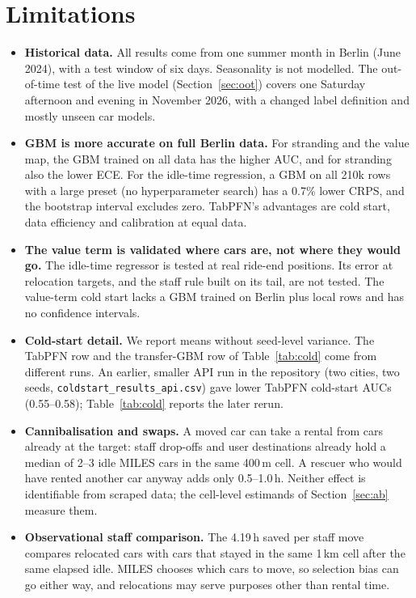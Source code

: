 \documentclass[11pt,a4paper]{article}
\begin{document}
\section{Limitations}\label{sec:limits}

\begin{itemize}
\item \textbf{Historical data.} All results come from one summer month in Berlin (June 2024), with a test window of six days. Seasonality is not modelled. The out-of-time test of the live model (Section~\ref{sec:oot}) covers one Saturday afternoon and evening in November 2026, with a changed label definition and mostly unseen car models.
\item \textbf{GBM is more accurate on full Berlin data.} For stranding and the value map, the GBM trained on all data has the higher AUC, and for stranding also the lower ECE. For the idle-time regression, a GBM on all 210k rows with a large preset (no hyperparameter search) has a 0.7\% lower CRPS, and the bootstrap interval excludes zero. TabPFN's advantages are cold start, data efficiency and calibration at equal data.
\item \textbf{The value term is validated where cars are, not where they would go.} The idle-time regressor is tested at real ride-end positions. Its error at relocation targets, and the staff rule built on its tail, are not tested. The value-term cold start lacks a GBM trained on Berlin plus local rows and has no confidence intervals.
\item \textbf{Cold-start detail.} We report means without seed-level variance. The TabPFN row and the transfer-GBM row of Table~\ref{tab:cold} come from different runs. An earlier, smaller API run in the repository (two cities, two seeds, \texttt{coldstart\_results\_api.csv}) gave lower TabPFN cold-start AUCs (0.55--0.58); Table~\ref{tab:cold} reports the later rerun.
\item \textbf{Cannibalisation and swaps.} A moved car can take a rental from cars already at the target: staff drop-offs and user destinations already hold a median of 2--3 idle MILES cars in the same 400\,m cell. A rescuer who would have rented another car anyway adds only 0.5--1.0\,h. Neither effect is identifiable from scraped data; the cell-level estimands of Section~\ref{sec:ab} measure them.
\item \textbf{Observational staff comparison.} The 4.19\,h saved per staff move compares relocated cars with cars that stayed in the same 1\,km cell after the same elapsed idle. MILES chooses which cars to move, so selection bias can go either way, and relocations may serve purposes other than rental time.

\end{itemize}
\end{document}
